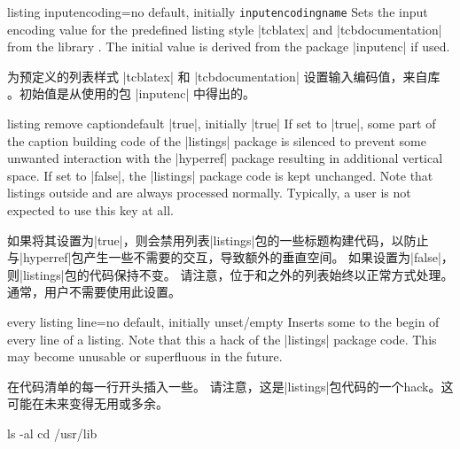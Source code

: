 \begin{docTcbKey}{listing inputencoding}{=}{no default, initially \texttt{\cs inputencodingname}}
Sets the input encoding value for the predefined listing style |tcblatex|
and |tcbdocumentation| from the library .
The initial value is derived from the package |inputenc| if used.

为预定义的列表样式 |tcblatex| 和 |tcbdocumentation| 设置输入编码值，来自库 。初始值是从使用的包 |inputenc| 中得出的。
\end{docTcbKey}

\begin{docTcbKey}{listing remove caption}{}{default |true|, initially |true|}
If set to |true|, some part of the caption building code of the |listings| package
is silenced to prevent some unwanted interaction with the |hyperref| package resulting
in additional vertical space.
If set to |false|, the |listings| package code is kept unchanged.
Note that listings outside  and
 are always processed normally.
Typically, a user is not expected to use this key at all.

如果将其设置为|true|，则会禁用列表|listings|包的一些标题构建代码，以防止与|hyperref|包产生一些不需要的交互，导致额外的垂直空间。 如果设置为|false|，则|listings|包的代码保持不变。 请注意，位于和之外的列表始终以正常方式处理。 通常，用户不需要使用此设置。
\end{docTcbKey}

\begin{docTcbKey}{every listing line}{=}{no default, initially unset/empty}
Inserts some  to the begin of every line of a listing.
Note that this a hack of the |listings| package code. This may become unusable
or superfluous in the future.

在代码清单的每一行开头插入一些。 请注意，这是|listings|包代码的一个hack。这可能在未来变得无用或多余。
\begin{dispExample}

\begin{commandshell}
ls -al
cd /usr/lib
\end{commandshell}
\end{dispExample}
\end{docTcbKey}


